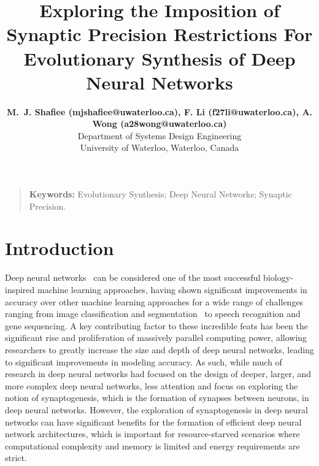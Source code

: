 \documentclass[10pt,letterpaper]{article}
\title{Exploring the Imposition of Synaptic Precision Restrictions For Evolutionary Synthesis of Deep Neural Networks}
\author{{\large \bf M.~J. Shafiee (mjshafiee@uwaterloo.ca), F. Li (f27li@uwaterloo.ca), A. Wong (a28wong@uwaterloo.ca)} \\
 Department of Systems Design Engineering\\
University of Waterloo, Waterloo, Canada}
\begin{document}
\maketitle


\vspace{-0.55cm }
\begin{quote}
\small
\textbf{Keywords:}
Evolutionary Synthesis; Deep Neural Networks; Synaptic Precision.
\end{quote}
\vspace{-0.55cm }
\section{Introduction}

	Deep neural networks~\cite{lecun2015deep} can be considered one of the most successful biology-inspired machine learning approaches, having shown significant improvements in accuracy over other machine learning approaches for a wide range of challenges ranging from image classification and segmentation~\cite{krizhevsky2012imagenet} to speech recognition and gene sequencing. A key contributing factor to these incredible feats has been the significant rise and proliferation of massively parallel computing power, allowing researchers to greatly increase the size and depth of deep neural networks, leading to significant improvements in modeling accuracy.  As such, while much of research in deep neural networks had focused on the design of deeper, larger, and more complex deep neural networks, less attention and focus on exploring the notion of synaptogenesis, which is the formation of synapses between neurons, in deep neural networks.  However, the exploration of synaptogenesis in deep neural networks can have significant benefits for the formation of efficient deep neural network architectures, which is important for resource-starved scenarios where computational complexity and memory is limited and energy requirements are strict.
	
\end{document}
